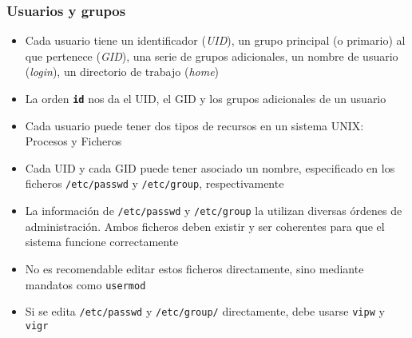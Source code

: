 \documentclass[ucs]{beamer}
\begin{document}
\begin{frame}[fragile]
  \frametitle{Usuarios y grupos}
  \begin{itemize}
    \item Cada usuario tiene un identificador (\emph{UID}), un grupo
      principal (o primario) al que pertenece (\emph{GID}), una serie de grupos
      adicionales, un nombre de usuario (\emph{login}), un directorio
      de trabajo  (\emph{home})
    \item La orden \texttt{\textbf{id}} nos da el UID, el GID y los
      grupos adicionales de un usuario

    \item Cada usuario puede tener dos tipos de recursos en un sistema
      UNIX: Procesos y Ficheros
  \end{itemize}
\end{frame}

\begin{frame}[fragile]
  \begin{itemize}
    \item Cada UID y cada GID puede tener asociado un nombre,
      especificado en los ficheros \texttt{/etc/passwd} y \texttt{/etc/group},
      respectivamente
    \item La información de \verb+/etc/passwd+ y \verb+/etc/group+ la utilizan
      diversas órdenes de administración.
      Ambos ficheros deben existir y ser coherentes para que el sistema funcione correctamente
 \item 
No es recomendable editar estos ficheros directamente, sino mediante mandatos
como \verb|usermod|
\item
Si se edita \verb|/etc/passwd| y \verb|/etc/group/| directamente, debe usarse
\verb|vipw| y \verb|vigr|
  \end{itemize}
\end{frame}
\end{document}
